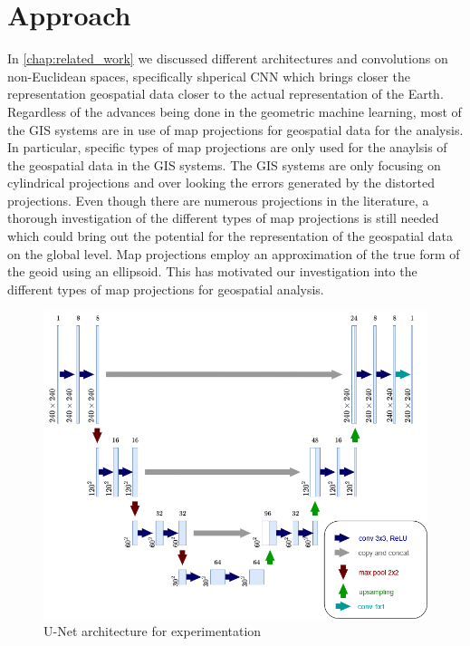 \clearpage
\cleardoublepage

\chapter{Approach}

In  \autoref{chap:related_work} we discussed different architectures and convolutions on non-Euclidean spaces, specifically shperical CNN which brings closer the representation geospatial data closer to the actual representation of the Earth. Regardless of the advances being done in the geometric machine learning, most of the GIS systems are in use of map projections for geospatial data for the analysis. In particular, specific types of map projections are only used for the anaylsis of the geospatial data in the GIS systems. The GIS systems are only focusing on cylindrical projections and over looking the errors generated by the distorted projections. Even though there are numerous projections in the literature, a thorough investigation of the different types of map projections is still needed which could bring out the potential for the representation of the geospatial data on the global level. Map projections employ an approximation of the true form of the geoid using an ellipsoid. This has motivated our investigation into the different types of map projections for geospatial analysis.

\begin{figure}[h]
    \centering
    \includegraphics[width=1.0\linewidth]{figures/chapter-5/my_unet.png}
    \caption{U-Net architecture for experimentation }
    \label{fig:self-unet}
\end{figure}

